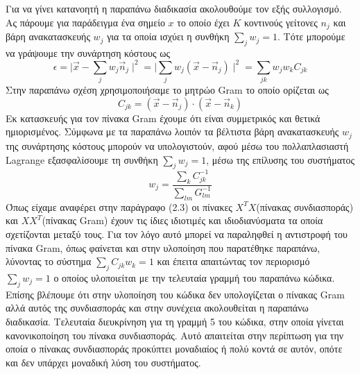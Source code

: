 Για να γίνει κατανοητή η παραπάνω διαδικασία ακολουθούμε τον εξής συλλογισμό. Ας πάρουμε για παράδειγμα ένα σημείο $x$ το οποίο έχει $K$ κοντινούς γείτονες $n_{j}$ και βάρη ανακατασκευής $w_{j}$ για τα οποία ισχύει η συνθήκη $\sum_{j} w_{j} = 1$. Τότε μπορούμε να γράψουμε την συνάρτηση κόστους ως
\newline\hspace*{\fill}
\begin{equation}
        \epsilon = \mid \overrightarrow{x} - \sum_{j} w_{j}\overrightarrow{n}_{j} \mid ^{2} = \mid \sum_{j} w_{j}(\overrightarrow{x}-\overrightarrow{n}_{j}) \mid ^{2} = \sum_{jk} w_{j}w_{k}C_{jk}
\end{equation}
\hspace*{\fill}\newline
Στην παραπάνω σχέση χρησιμοποιήσαμε το μητρώο \textlatin{Gram} το οποίο ορίζεται ως
\newline\hspace*{\fill}
\begin{equation}
        C_{jk} = (\overrightarrow{x}-\overrightarrow{n}_{j})
        \cdot(\overrightarrow{x}-\overrightarrow{n}_{k})
\end{equation}
\hspace*{\fill}\newline
Εκ κατασκευής για τον πίνακα \textlatin{Gram} έχουμε ότι είναι συμμετρικός και θετικά ημιορισμένος. Σύμφωνα με τα παραπάνω λοιπόν τα βέλτιστα βάρη ανακατασκευής $w_{j}$ της συνάρτησης κόστους μπορούν να υπολογιστούν, αφού μέσω του πολλαπλασιαστή \textlatin{Lagrange} εξασφαλίσουμε τη συνθήκη $\sum_{j} w_{j} = 1$, μέσω της επίλυσης του συστήματος
\newline\hspace*{\fill}
\begin{equation}
	w_{j} = \dfrac{\sum_{k}C_{jk}^{-1}}{\sum_{lm}G_{lm}^{-1}}
\end{equation}
\hspace*{\fill}\newline
Όπως είχαμε αναφέρει στην παράγραφο (2.3) οι πίνακες $X^{T}X$(πίνακας συνδιασποράς) και $XX^{T}$(πίνακας \textlatin{Gram}) έχουν τις ίδιες ιδιοτιμές και ιδιοδιανύσματα τα οποία σχετίζονται μεταξύ τους. Για τον λόγο αυτό μπορεί να παραληφθεί η αντιστροφή του πίνακα \textlatin{Gram}, όπως φαίνεται και στην υλοποίηση που παρατέθηκε παραπάνω, λύνοντας το σύστημα $\sum_{j}C_{jk}w_{k}=1$ και έπειτα απαιτώντας τον περιορισμό $\sum_{j} w_{j}=1$ ο οποίος υλοποιείται με την τελευταία γραμμή του παραπάνω κώδικα. Επίσης βλέπουμε ότι στην υλοποίηση του κώδικα δεν υπολογίζεται ο πίνακας \textlatin{Gram} αλλά αυτός της συνδιασποράς και στην συνέχεια ακολουθείται η παραπάνω διαδικασία. Τελευταία διευκρίνηση για τη γραμμή 5 του κώδικα, στην οποία γίνεται κανονικοποίηση του πίνακα συνδιασποράς. Αυτό απαιτείται στην περίπτωση για την οποία ο πίνακας συνδιασποράς προκύπτει μοναδιαίος ή πολύ κοντά σε αυτόν, οπότε και δεν υπάρχει μοναδική λύση του συστήματος.
